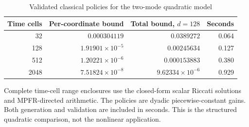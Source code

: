 \begin{table}[t]
\centering\small
\caption{Validated classical policies for the two-mode quadratic model}\label{tab:r18riccati}
\begin{tabular}{rrrr}
\toprule
Time cells & Per-coordinate bound & Total bound, $d=128$ & Seconds\\
\midrule
32 & $0.000304119$ & $0.0389272$ & 0.064\\
128 & $1.91901\times10^{-5}$ & $0.00245634$ & 0.127\\
512 & $1.20221\times10^{-6}$ & $0.000153883$ & 0.380\\
2048 & $7.51824\times10^{-8}$ & $9.62334\times10^{-6}$ & 0.929\\
\bottomrule
\end{tabular}
\par\smallskip\begin{minipage}{.98\linewidth}\footnotesize Complete time-cell range enclosures use the closed-form scalar Riccati solutions and MPFR-directed arithmetic. The policies are dyadic piecewise-constant gains. Both generation and validation are included in seconds. This is the structured quadratic comparison, not the nonlinear application.\end{minipage}
\end{table}
